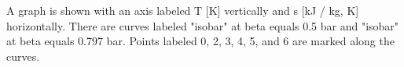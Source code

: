 A graph is shown with an axis labeled T [K] vertically and s [kJ / kg, K] horizontally. There are curves labeled "isobar" at beta equals 0.5 bar and "isobar" at beta equals 0.797 bar. Points labeled 0, 2, 3, 4, 5, and 6 are marked along the curves.